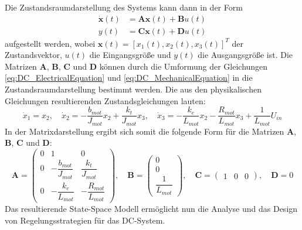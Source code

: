 Die Zustandsraumdarstellung des Systems kann dann in der Form
\begin{align}
    \dot{\mathbf{x}}(t) &= \mathbf{A} \mathbf{x}(t) + \mathbf{B} u(t) \\
    y(t) &= \mathbf{C} \mathbf{x}(t) + \mathbf{D} u(t)
\end{align}
\newline
aufgestellt werden, wobei $\mathbf{x}(t) = [x_1(t), x_2(t), x_3(t)]^T$ der Zustandsvektor, $u(t)$ die Eingangsgröße und $y(t)$ die Ausgangsgröße ist.
Die Matrizen $\mathbf{A}$, $\mathbf{B}$, $\mathbf{C}$ und $\mathbf{D}$ können durch die Umformung der Gleichungen \ref{eq:DC_ElectricalEquation} und \ref{eq:DC_MechanicalEquation} in die Zustandsraumdarstellung bestimmt werden. 
Die aus den physikalischen Gleichungen resultierenden Zustandsgleichungen lauten:
\begin{equation}
    \label{eq:DC_StateSpaceEquations}
    \dot{x}_1 = x_2 , \quad \dot{x}_2 = -\frac{b_{mot}}{J_{mot}}x_2 + \frac{k_t}{J_{mot}}x_3, \quad \dot{x}_3 = -\frac{k_e}{L_{mot}}x_2 - \frac{R_{mot}}{L_{mot}}x_3 + \frac{1}{L_{mot}}U_{in}
\end{equation}
\newline
In der Matrixdarstellung ergibt sich somit die folgende Form für die Matrizen $\mathbf{A}$, $\mathbf{B}$, $\mathbf{C}$ und $\mathbf{D}$:
\begin{equation}
    \label{eq:DC_StateSpaceMatrices}
    \mathbf{A} = \begin{pmatrix} 0 & 1 & 0 \\ 0 & -\dfrac{b_{mot}}{J_{mot}} & \dfrac{k_t}{J_{mot}} \\ 0 & -\dfrac{k_e}{L_{mot}} & -\dfrac{R_{mot}}{L_{mot}} \end{pmatrix}, \quad \mathbf{B} = \begin{pmatrix} 0 \\ 0 \\ \dfrac{1}{L_{mot}} \end{pmatrix}, \quad \mathbf{C} = \begin{pmatrix} 1 & 0 & 0 \end{pmatrix}, \quad \mathbf{D} = 0
\end{equation}
\newline
Das resultierende State-Space Modell ermöglicht nun die Analyse und das Design von Regelungsstrategien für das DC-System.
\newline

